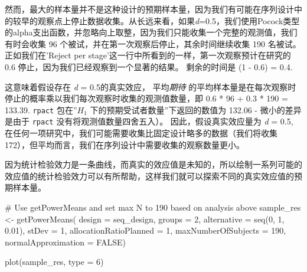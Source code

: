 \documentclass[
  letterpaper,
  DIV=11,
  numbers=noendperiod]{scrreprt}
\newenvironment{Shaded}{\begin{snugshade}}{\end{snugshade}}
\newcommand{\AttributeTok}[1]{\textcolor[rgb]{0.40,0.45,0.13}{#1}}
\newcommand{\CommentTok}[1]{\textcolor[rgb]{0.37,0.37,0.37}{#1}}
\newcommand{\ConstantTok}[1]{\textcolor[rgb]{0.56,0.35,0.01}{#1}}
\newcommand{\DecValTok}[1]{\textcolor[rgb]{0.68,0.00,0.00}{#1}}
\newcommand{\FloatTok}[1]{\textcolor[rgb]{0.68,0.00,0.00}{#1}}
\newcommand{\FunctionTok}[1]{\textcolor[rgb]{0.28,0.35,0.67}{#1}}
\newcommand{\NormalTok}[1]{\textcolor[rgb]{0.00,0.23,0.31}{#1}}
\newcommand{\OtherTok}[1]{\textcolor[rgb]{0.00,0.23,0.31}{#1}}
\begin{document}
然而，最大的样本量并不是这种设计的预期样本量，因为我们有可能在序列设计中的较早的观察点上停止数据收集。从长远来看，如果\emph{d}=0.5，我们使用Pocock类型的alpha支出函数，并忽略向上取整，因为我们只能收集一个完整的观测值，我们有时会收集
96 个被试，并在第一次观察后停止，其余时间继续收集 190 名被试。
正如我们在'Reject per stage'这一行中所看到的一样，第一次观察预计在研究的
0.6 停止，因为我们已经观察到一个显著的结果。 剩余的时间是 (1 - 0.6) =
0.4.

这意味着假设存在 \emph{d} = 0.5的真实效应， 平均\emph{期待}
的平均样本量是在每次观察时停止的概率乘以我们每次观察时收集的观测值数量，即
0.6 * 96 + 0.3 * 190 = 133.39. \texttt{rpact} 包在''\(H_1\)
下的预期受试者数量''下返回的数值为 132.06 - 微小的差异是由于
\texttt{rpact} 没有将观测值数量四舍五入）。 因此，假设真实效应量为
\emph{d} = 0.5,
在任何一项研究中，我们可能需要收集比固定设计略多的数据（我们将收集
172），但平均而言，我们在序列设计中需要收集的观察数量更小。

因为统计检验效力是一条曲线，而真实的效应值是未知的，所以绘制一系列可能的效应值的统计检验效力可以有所帮助，这样我们就可以探索不同的真实效应值的预期样本量。

\begin{Shaded}
\begin{Highlighting}[]
\CommentTok{\# Use getPowerMeans and set max N to 190 based on analysis above}
\NormalTok{sample\_res }\OtherTok{\textless{}{-}} \FunctionTok{getPowerMeans}\NormalTok{(}
  \AttributeTok{design =}\NormalTok{ seq\_design,}
  \AttributeTok{groups =} \DecValTok{2}\NormalTok{,}
  \AttributeTok{alternative =} \FunctionTok{seq}\NormalTok{(}\DecValTok{0}\NormalTok{, }\DecValTok{1}\NormalTok{, }\FloatTok{0.01}\NormalTok{), }
  \AttributeTok{stDev =} \DecValTok{1}\NormalTok{, }
  \AttributeTok{allocationRatioPlanned =} \DecValTok{1}\NormalTok{,}
  \AttributeTok{maxNumberOfSubjects =} \DecValTok{190}\NormalTok{, }
  \AttributeTok{normalApproximation =} \ConstantTok{FALSE}\NormalTok{)}

\FunctionTok{plot}\NormalTok{(sample\_res, }\AttributeTok{type =} \DecValTok{6}\NormalTok{)}
\end{Highlighting}
\end{Shaded}
\end{document}

